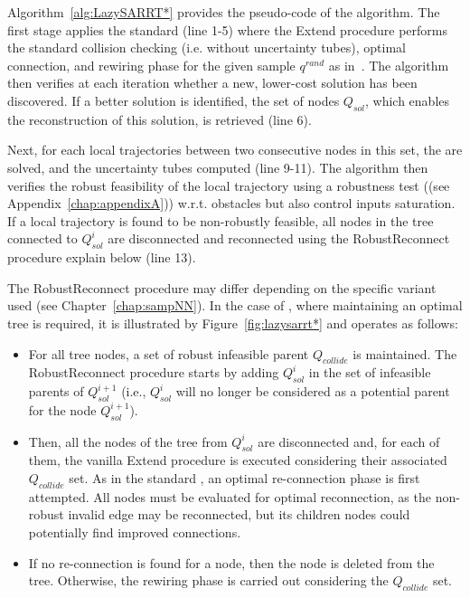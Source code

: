 Algorithm~\ref{alg:LazySARRT*} provides the pseudo-code of the  algorithm.
The first stage applies the standard  (line 1-5) where the Extend procedure performs the standard collision checking (i.e. without uncertainty tubes), optimal connection, and rewiring phase for the given sample  $q^{rand}$ as in~\cite{cRRTstar}.
The algorithm then verifies at each iteration whether a new, lower-cost solution has been discovered. 
If a better solution is identified, the set of nodes $Q_{sol}$, which enables the reconstruction of this solution, is retrieved (line 6).

Next, for each local trajectories between two consecutive nodes in this set, the  are solved, and the uncertainty tubes computed (line 9-11).
The algorithm then verifies the robust feasibility of the local trajectory using a robustness test ((see Appendix~\ref{chap:appendixA})) w.r.t. obstacles but also control inputs saturation. 
If a local trajectory is found to be non-robustly feasible, all nodes in the tree connected to $Q_{sol}^i$ are disconnected and reconnected using the RobustReconnect procedure explain below (line 13).

The RobustReconnect procedure may differ depending on the specific  variant used (see Chapter~\ref{chap:sampNN}). 
In the case of , where maintaining an optimal tree is required, it is illustrated by Figure~\ref{fig:lazysarrt*} and operates as follows:
\begin{itemize}
    \item For all tree nodes, a set of robust infeasible parent $Q_{collide}$ is maintained. 
    The RobustReconnect procedure starts by adding $Q_{sol}^i$ in the set of infeasible parents of $Q_{sol}^{i+1}$ (i.e., $Q_{sol}^i$ will no longer be considered as a potential parent for the node $Q_{sol}^{i+1}$).
    \item Then, all the nodes of the tree from $Q_{sol}^i$ are disconnected and, for each of them, the vanilla Extend procedure is executed considering their associated $Q_{collide}$ set.
    As in the standard , an optimal re-connection phase is first attempted.
    All nodes must be evaluated for optimal reconnection, as the non-robust invalid edge may be reconnected, but its children nodes could potentially find improved connections.
    \item If no re-connection is found for a node, then the node is deleted from the tree. 
    Otherwise, the rewiring phase is carried out considering the $Q_{collide}$ set.
\end{itemize}

